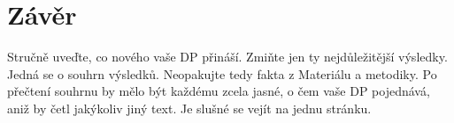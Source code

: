 \chapter*{Závěr}

Stručně uveďte, co nového vaše DP přináší. Zmiňte jen ty nejdůležitější výsledky. Jedná se o souhrn výsledků. Neopakujte tedy fakta z Materiálu a metodiky.  Po přečtení souhrnu by mělo být každému zcela jasné, o čem vaše DP pojednává, aniž by četl jakýkoliv jiný text. Je slušné se vejít na jednu stránku. 


